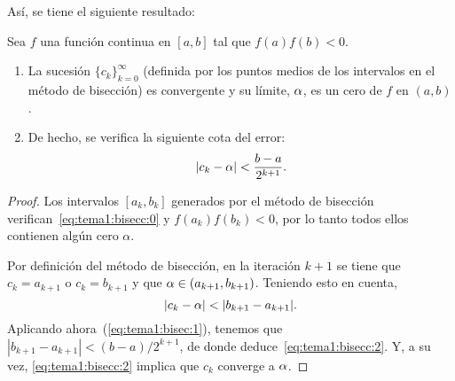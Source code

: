 Así, se tiene el siguiente resultado:
\begin{theorem}
  \label{thm:tema1:bisecc}
  Sea $f$ una función continua en $[a,b]$ tal que $f(a)f(b)<0$.
  \begin{enumerate}
  \item La sucesión $\{c_k\}_{k=0}^\infty$ (definida por los puntos
    medios de los intervalos en el método de bisección) es convergente
    y su límite, $\alpha$, es un cero de $f$ en $(a,b)$.
  \item De hecho, se verifica la siguiente cota del error:
    \begin{equation}
      \label{eq:tema1:bisecc:2}
      |c_k-\alpha| < \frac{b-a}{2^{k+1}}.
    \end{equation}
  \end{enumerate}
\end{theorem}

\begin{proof}
  Los intervalos $[a_k,b_k]$ generados por el método de bisección
  verifican~\eqref{eq:tema1:bisecc:0} y $f(a_k)f(b_k)<0$, por lo tanto
  todos ellos contienen algún cero $\alpha$.

  Por definición del método de bisección, en la iteración $k+1$ se
  tiene que $c_k=a_{k+1}$ o $c_k=b_{k+1}$ y que
  $\alpha \in (a_{k+1},b_{k+1})$. Teniendo esto en cuenta,
  $$|c_k-\cero|<|b_{k+1}-a_{k+1}|.$$
  Aplicando ahora~(\ref{eq:tema1:bisec:1}), tenemos que
  $|b_{k+1}-a_{k+1}|<(b-a)/2^{k+1}$, de donde
  deduce~\eqref{eq:tema1:bisecc:2}. Y, a su vez,
  \eqref{eq:tema1:bisecc:2} implica que $c_k$ converge a $\alpha$.
\end{proof}

